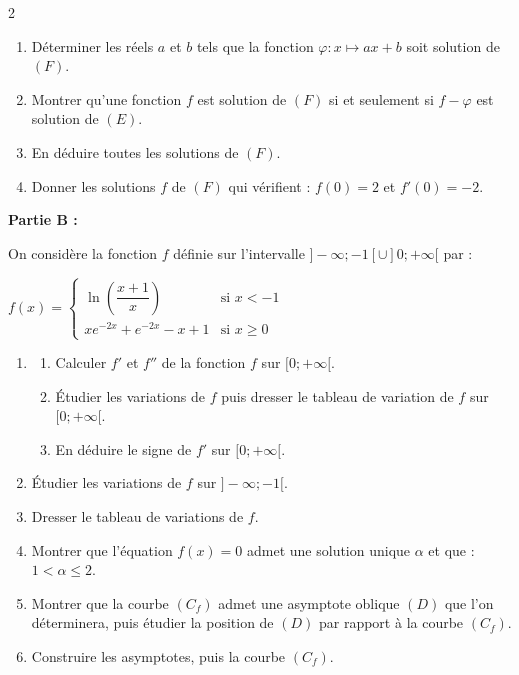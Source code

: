 \documentclass[12pt,a4paper]{article}
\begin{document}
\begin{multicols}{2}
\begin{enumerate}
\begin{enumerate}
\item Déterminer les réels $a$ et $b$ tels que la fonction $\varphi : x \mapsto ax+b$ soit solution de $(F)$.
\item Montrer qu’une fonction $f$ est solution de $(F)$ si et seulement si $f-\varphi$ est solution de $(E)$.
\item En déduire toutes les solutions de $(F)$.
\item Donner les solutions $f$ de $(F)$ qui vérifient :  
\( f(0)=2 \) et \( f'(0)=-2. \)
\end{enumerate}
\end{enumerate}

\textbf{Partie B :}

On considère la fonction $f$ définie sur l’intervalle  
\( ]-\infty;-1[\cup]0;+\infty[ \) par :

\(
f(x)=
\begin{cases}
\ln\left(\dfrac{x+1}{x}\right) & \text{si } x<-1 \\[0.4cm]
xe^{-2x}+e^{-2x}-x+1 & \text{si } x\geq 0
\end{cases}
\)

\begin{enumerate}
\item 
\begin{enumerate}
\item Calculer $f'$ et $f''$ de la fonction $f$ sur $[0;+\infty[$.
\item Étudier les variations de $f$ puis dresser le tableau de variation de $f$ sur $[0;+\infty[$.
\item En déduire le signe de $f'$ sur $[0;+\infty[$.
\end{enumerate}

\item Étudier les variations de $f$ sur $]-\infty;-1[$.

\item Dresser le tableau de variations de $f$.

\item Montrer que l’équation \( f(x)=0 \) admet une solution unique $\alpha$ et que :  
\( 1<\alpha\leq 2. \)

\item Montrer que la courbe $(C_f)$ admet une asymptote oblique $(D)$ que l’on déterminera, puis étudier la position de $(D)$ par rapport à la courbe $(C_f)$.

\item Construire les asymptotes, puis la courbe $(C_f)$.
\end{enumerate}


\end{multicols}
\end{document}
